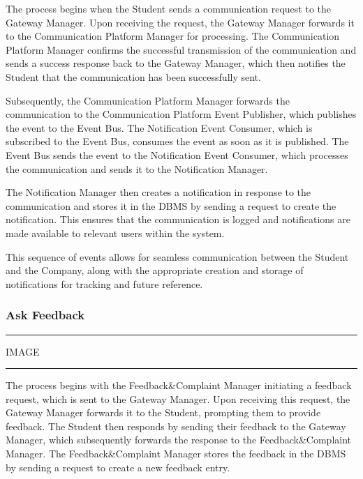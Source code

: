 The process begins when the Student sends a communication request to the Gateway Manager. Upon receiving the request, the Gateway Manager forwards it to the Communication Platform Manager for processing. The Communication Platform Manager confirms the successful transmission of the communication and sends a success response back to the Gateway Manager, which then notifies the Student that the communication has been successfully sent.

Subsequently, the Communication Platform Manager forwards the communication to the Communication Platform Event Publisher, which publishes the event to the Event Bus. The Notification Event Consumer, which is subscribed to the Event Bus, consumes the event as soon as it is published. The Event Bus sends the event to the Notification Event Consumer, which processes the communication and sends it to the Notification Manager.

The Notification Manager then creates a notification in response to the communication and stores it in the DBMS by sending a request to create the notification. This ensures that the communication is logged and notifications are made available to relevant users within the system.

This sequence of events allows for seamless communication between the Student and the Company, along with the appropriate creation and storage of notifications for tracking and future reference.

\subsubsection{Ask Feedback}

\vspace{20pt}
\hrule
\vspace{10pt}
IMAGE
\vspace{10pt}
\hrule
\vspace{20pt}

The process begins with the Feedback\&Complaint Manager initiating a feedback request, which is sent to the Gateway Manager. Upon receiving this request, the Gateway Manager forwards it to the Student, prompting them to provide feedback. The Student then responds by sending their feedback to the Gateway Manager, which subsequently forwards the response to the Feedback\&Complaint Manager. The Feedback\&Complaint Manager stores the feedback in the DBMS by sending a request to create a new feedback entry.

